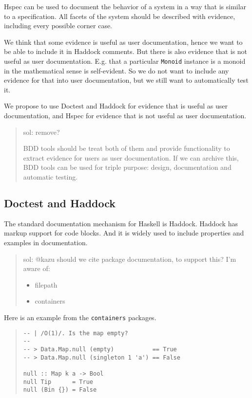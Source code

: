 \documentclass[preprint]{sigplanconf}
\begin{document}
Hspec can be used to document the behavior of a system in a way that
is similar to a specification.  All facets of the system should be
described with evidence, including every possible corner case.

We think that some evidence is useful as user documentation, hence we
want to be able to include it in Haddock comments.  But there is also
evidence that is not useful as user documentation.  E.g. that a
particular \texttt{Monoid} instance is a monoid in the mathematical
sense is self-evident.  So we do not want to include any evidence for
that into user documentation, but we still want to automatically test
it.

We propose to use Doctest and Haddock for evidence that is useful as
user documentation, and Hspec for evidence that is not useful as user
documentation.

\begin{quote}
    sol: remove?

BDD tools should be treat both of them and provide functionality
to extract evidence for users as user documentation.
If we can archive this, BDD tools can be used for
triple purpose: design, documentation and automatic testing.
\end{quote}

\subsection{Doctest and Haddock}


The standard documentation mechanism for Haskell is
Haddock.
Haddock has markup support for code blocks.  And it is widely used to
include properties and examples in documentation.

\begin{quote}
    sol: @kazu should we cite package documentation, to support this?
    I'm aware of:
    \begin{itemize}
        \item filepath
        \item containers
    \end{itemize}
\end{quote}

Here is an example from the {\tt containers} packages.

\begin{quote}
\small
\begin{verbatim}
-- | /O(1)/. Is the map empty?
--
-- > Data.Map.null (empty)           == True
-- > Data.Map.null (singleton 1 'a') == False

null :: Map k a -> Bool
null Tip      = True
null (Bin {}) = False
\end{verbatim}
\end{quote}
\end{document}

